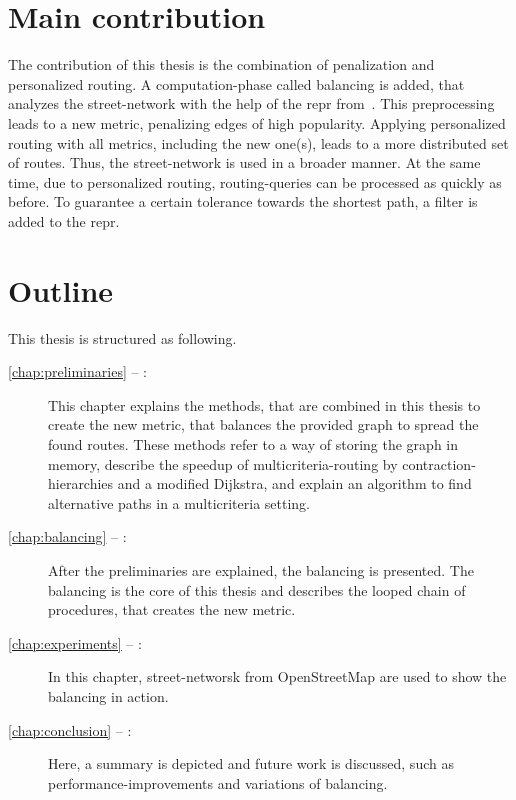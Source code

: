 \section{Main contribution}

    The contribution of this thesis is the combination of penalization and personalized routing.
    A computation-phase called balancing is added, that analyzes the street-network with the help of the \gls{repr} from~\cite{barth:alternative_routes}.
    This preprocessing leads to a new metric, penalizing edges of high popularity.
    Applying personalized routing with all metrics, including the new one(s), leads to a more distributed set of routes.
    Thus, the street-network is used in a broader manner.
    At the same time, due to personalized routing, routing-queries can be processed as quickly as before.
    To guarantee a certain tolerance towards the shortest path, a filter is added to the \gls{repr}.

\section{Outline}

    This thesis is structured as following.
    \begin{description}
        \item[\cref{chap:preliminaries} -- :]
            This chapter explains the methods, that are combined in this thesis to create the new metric, that balances the provided graph to spread the found routes.
            These methods refer to a way of storing the graph in memory, describe the speedup of multicriteria-routing by contraction-hierarchies and a modified Dijkstra, and explain an algorithm to find alternative paths in a multicriteria setting.
        \item[\cref{chap:balancing} -- :]
            After the preliminaries are explained, the balancing is presented.
            The balancing is the core of this thesis and describes the looped chain of procedures, that creates the new metric.
        \item[\cref{chap:experiments} -- :]
            In this chapter, street-networsk from OpenStreetMap are used to show the balancing in action.
        \item[\cref{chap:conclusion} -- :]
            Here, a summary is depicted and future work is discussed, such as performance-improvements and variations of balancing.
    \end{description}